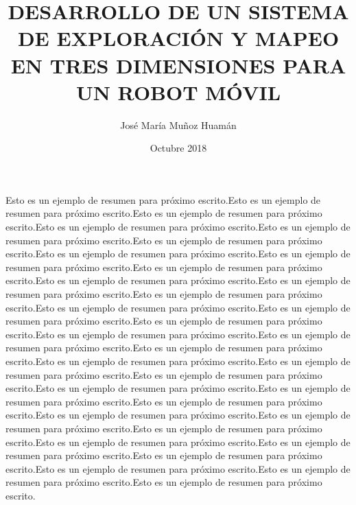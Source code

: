 \documentclass[a4paper, 12pt, oneside]{JMtesis}
\begin{document}
\frontmatter
{}
\title {DESARROLLO DE UN SISTEMA DE EXPLORACIÓN Y MAPEO EN TRES DIMENSIONES PARA UN ROBOT MÓVIL}
\author{Jos\'e Mar\'ia Muñoz Huam\'an}
\date{Octubre 2018}

\maketitle
{}

%
%
%

\tableofcontents
\resumen

Esto es un ejemplo de resumen para próximo escrito.Esto es un ejemplo de resumen para próximo escrito.Esto es un ejemplo de resumen para próximo escrito.Esto es un ejemplo de resumen para próximo escrito.Esto es un ejemplo de resumen para próximo escrito.Esto es un ejemplo de resumen para próximo escrito.Esto es un ejemplo de resumen para próximo escrito.Esto es un ejemplo de resumen para próximo escrito.Esto es un ejemplo de resumen para próximo escrito.Esto es un ejemplo de resumen para próximo escrito.Esto es un ejemplo de resumen para próximo escrito.Esto es un ejemplo de resumen para próximo escrito.Esto es un ejemplo de resumen para próximo escrito.Esto es un ejemplo de resumen para próximo escrito.Esto es un ejemplo de resumen para próximo escrito.Esto es un ejemplo de resumen para próximo escrito.Esto es un ejemplo de resumen para próximo escrito.Esto es un ejemplo de resumen para próximo escrito.Esto es un ejemplo de resumen para próximo escrito.Esto es un ejemplo de resumen para próximo escrito.Esto es un ejemplo de resumen para próximo escrito.Esto es un ejemplo de resumen para próximo escrito.Esto es un ejemplo de resumen para próximo escrito.Esto es un ejemplo de resumen para próximo escrito.Esto es un ejemplo de resumen para próximo escrito.Esto es un ejemplo de resumen para próximo escrito.Esto es un ejemplo de resumen para próximo escrito.Esto es un ejemplo de resumen para próximo escrito.Esto es un ejemplo de resumen para próximo escrito.Esto es un ejemplo de resumen para próximo escrito.Esto es un ejemplo de resumen para próximo escrito.Esto es un ejemplo de resumen para próximo escrito.Esto es un ejemplo de resumen para próximo escrito.
\end{document}
